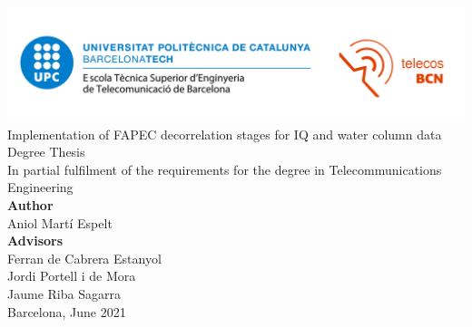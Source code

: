 \thispagestyle{empty}

\begin{center}
	\includegraphics[width=\textwidth]{images/logo.png}\\
	
	\vspace*{2.5cm}
	\Huge
	Implementation of FAPEC decorrelation stages for IQ and water column data\\
	
	\vspace*{2.6cm}
	\large
	Degree Thesis\\
	In partial fulfilment of the requirements for the degree in Telecommunications Engineering\\
	
	\vspace*{2cm}
	\textbf{Author}\\
	Aniol Martí Espelt\\
	\vspace*{1.5em}
	\textbf{Advisors}\\
	Ferran de Cabrera Estanyol\\
	Jordi Portell i de Mora\\
	Jaume Riba Sagarra\\
	
	\vspace*{2.5cm}
	Barcelona, June 2021
	
\end{center}
